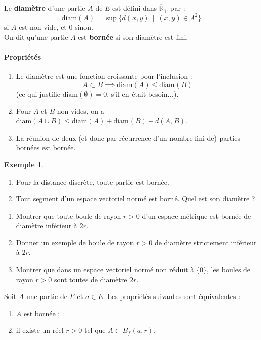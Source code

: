 \documentclass[french]{article}
\newcommand{\R}{\mathbb{R}}
\theoremstyle{plain}
\theoremstyle{definition}
\newtheorem*{ex}{Exemple}
\theoremstyle{remark}
\begin{document}
\begin{dfn}
	Le \textbf{diamètre} d'une partie $A$ de $E$ est défini dans $\overline{\R}_+$ par : $$\text{diam}(A)=\sup\{d(x,y)\ \mid\ (x,y)\in A^2\}$$ si $A$ est non vide, et $0$ sinon.\\
	On dit qu'une partie $A$ est \textbf{bornée} si son diamètre est fini.
\end{dfn}

\paragraph{Propriétés}
\begin{enumerate}
	\item Le diamètre est une fonction croissante pour l'inclusion : $$A\subset B\implies\text{diam}(A)\leqslant\text{diam}(B)$$
	(ce qui justifie $\text{diam}(\emptyset)=0$, s'il en était besoin...).
	\item Pour $A$ et $B$ non vides, on a $\text{diam}(A\cup B)\leqslant\text{diam}(A)+\text{diam}(B)+d(A,B)$.
	\item La réunion de deux (et donc par récurrence d'un nombre fini de) parties bornées est bornée.
\end{enumerate}

\begin{ex}
	\begin{enumerate}
		\item Pour la distance discrète, toute partie est bornée.
		\item Tout segment d'un espace vectoriel normé est borné. Quel est son diamètre ?
	\end{enumerate}
\end{ex}

\begin{exo}
	\begin{enumerate}
		\item Montrer que toute boule de rayon $r>0$ d'un espace métrique est bornée de diamètre inférieur à $2r$.
		\item Donner un exemple de boule de rayon $r>0$ de diamètre strictement inférieur à $2r$.
		\item Montrer que dans un espace vectoriel normé non réduit à $\{0\}$, les boules de rayon $r>0$ sont toutes de diamètre $2r$.
	\end{enumerate}
\end{exo}

\begin{prop}%
	Soit $A$ une partie de $E$ et $a\in E$. Les propriétés suivantes sont équivalentes :
	\begin{enumerate}[label=(\roman*)]
		\item $A$ est bornée ;
		\item il existe un réel $r>0$ tel que $A\subset B_f(a,r)$.
	\end{enumerate}
\end{prop}
\end{document}
